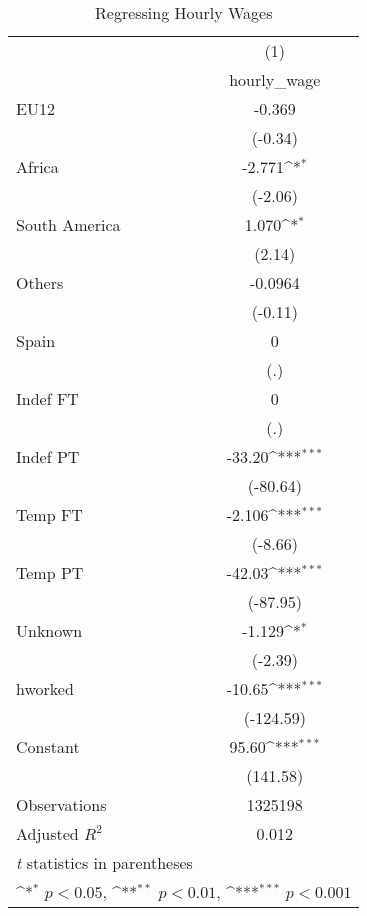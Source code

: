 \begin{table}[htbp]\centering
\def\sym#1{\ifmmode^{#1}\else\(^{#1}\)\fi}
\caption{Regressing Hourly Wages}
\begin{tabular}{l*{1}{c}}
\hline\hline
                    &\multicolumn{1}{c}{(1)}\\
                    &\multicolumn{1}{c}{hourly\_wage}\\
\hline
EU12                &      -0.369         \\
                    &     (-0.34)         \\
[1em]
Africa              &      -2.771\sym{*}  \\
                    &     (-2.06)         \\
[1em]
South America       &       1.070\sym{*}  \\
                    &      (2.14)         \\
[1em]
Others              &     -0.0964         \\
                    &     (-0.11)         \\
[1em]
Spain               &           0         \\
                    &         (.)         \\
[1em]
Indef FT            &           0         \\
                    &         (.)         \\
[1em]
Indef PT            &      -33.20\sym{***}\\
                    &    (-80.64)         \\
[1em]
Temp FT             &      -2.106\sym{***}\\
                    &     (-8.66)         \\
[1em]
Temp PT             &      -42.03\sym{***}\\
                    &    (-87.95)         \\
[1em]
Unknown             &      -1.129\sym{*}  \\
                    &     (-2.39)         \\
[1em]
hworked             &      -10.65\sym{***}\\
                    &   (-124.59)         \\
[1em]
Constant            &       95.60\sym{***}\\
                    &    (141.58)         \\
\hline
Observations        &     1325198         \\
Adjusted \(R^{2}\)  &       0.012         \\
\hline\hline
\multicolumn{2}{l}{\footnotesize \textit{t} statistics in parentheses}\\
\multicolumn{2}{l}{\footnotesize \sym{*} \(p<0.05\), \sym{**} \(p<0.01\), \sym{***} \(p<0.001\)}\\
\end{tabular}
\end{table}
